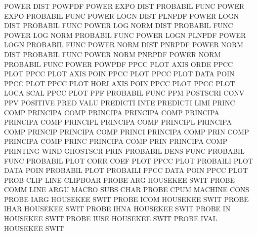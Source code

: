 POWER    DIST                           POWPDF
POWER    EXPO DIST                      PROBABIL FUNC
POWER    EXPO                           PROBABIL FUNC
POWER    LOGN DIST                      PLNPDF
POWER    LOGN DIST                      PROBABIL FUNC
POWER    LOG  NORM DIST                 PROBABIL FUNC
POWER    LOG  NORM                      PROBABIL FUNC
POWER    LOGN                           PLNPDF
POWER    LOGN                           PROBABIL FUNC
POWER    NORM DIST                      PNRPDF
POWER    NORM DIST                      PROBABIL FUNC
POWER    NORM                           PNRPDF
POWER    NORM                           PROBABIL FUNC
POWER                                   POWPDF
PPCC     PLOT AXIS ORDE                 PPCC     PLOT
PPCC     PLOT AXIS POIN                 PPCC     PLOT
PPCC     PLOT DATA POIN                 PPCC     PLOT
PPCC     PLOT HORI AXIS POIN            PPCC     PLOT
PPCC     PLOT LOCA SCAL                 PPCC     PLOT
PPF                                     PROBABIL FUNC
PPM                                     POSTSCRI CONV
PPV                                     POSITIVE PRED VALU
PREDICTI INTE                           PREDICTI LIMI
PRINC    COMP                           PRINCIPA COMP
PRINCIPA                                PRINCIPA COMP
PRINCIPA                                PRINCIPA COMP
PRINCIPL                                PRINCIPA COMP
PRINCIPL                                PRINCIPA COMP
PRINCIP                                 PRINCIPA COMP
PRINCI                                  PRINCIPA COMP
PRIN     COMP                           PRINCIPA COMP
PRINC                                   PRINCIPA COMP
PRIN                                    PRINCIPA COMP
PRINTING WIND                           GHOSTSCR PRIN
PROBABIL DENS FUNC                      PROBABIL FUNC
PROBABIL PLOT CORR COEF PLOT            PPCC     PLOT
PROBAILI PLOT DATA POIN                 PROBABIL PLOT
PROBAILI PPCC DATA POIN                 PPCC     PLOT
PROB     CLIP LINE                      CLIPBOAR
PROBE    ARG                            HOUSEKEE SWIT
PROBE    COMM LINE ARGU                 MACRO    SUBS CHAR
PROBE    CPUM                           MACHINE  CONS
PROBE    IARG                           HOUSEKEE SWIT
PROBE    ICOM                           HOUSEKEE SWIT
PROBE    IHAR                           HOUSEKEE SWIT
PROBE    IHNA                           HOUSEKEE SWIT
PROBE    IN                             HOUSEKEE SWIT
PROBE    IUSE                           HOUSEKEE SWIT
PROBE    IVAL                           HOUSEKEE SWIT
